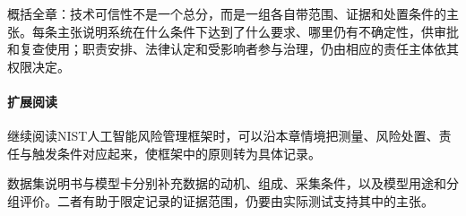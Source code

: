概括全章：技术可信性不是一个总分，而是一组各自带范围、证据和处置条件的主张。每条主张说明系统在什么条件下达到了什么要求、哪里仍有不确定性，供审批和复查使用；职责安排、法律认定和受影响者参与治理，仍由相应的责任主体依其权限决定。

\paragraph{扩展阅读}

继续阅读NIST人工智能风险管理框架时，可以沿本章情境把测量、风险处置、责任与触发条件对应起来，使框架中的原则转为具体记录。

数据集说明书与模型卡分别补充数据的动机、组成、采集条件，以及模型用途和分组评价。二者有助于限定记录的证据范围，仍要由实际测试支持其中的主张。
